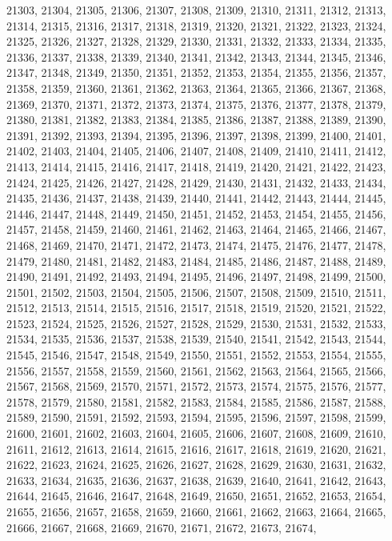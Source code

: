 21303,
21304,
21305,
21306,
21307,
21308,
21309,
21310,
21311,
21312,
21313,
21314,
21315,
21316,
21317,
21318,
21319,
21320,
21321,
21322,
21323,
21324,
21325,
21326,
21327,
21328,
21329,
21330,
21331,
21332,
21333,
21334,
21335,
21336,
21337,
21338,
21339,
21340,
21341,
21342,
21343,
21344,
21345,
21346,
21347,
21348,
21349,
21350,
21351,
21352,
21353,
21354,
21355,
21356,
21357,
21358,
21359,
21360,
21361,
21362,
21363,
21364,
21365,
21366,
21367,
21368,
21369,
21370,
21371,
21372,
21373,
21374,
21375,
21376,
21377,
21378,
21379,
21380,
21381,
21382,
21383,
21384,
21385,
21386,
21387,
21388,
21389,
21390,
21391,
21392,
21393,
21394,
21395,
21396,
21397,
21398,
21399,
21400,
21401,
21402,
21403,
21404,
21405,
21406,
21407,
21408,
21409,
21410,
21411,
21412,
21413,
21414,
21415,
21416,
21417,
21418,
21419,
21420,
21421,
21422,
21423,
21424,
21425,
21426,
21427,
21428,
21429,
21430,
21431,
21432,
21433,
21434,
21435,
21436,
21437,
21438,
21439,
21440,
21441,
21442,
21443,
21444,
21445,
21446,
21447,
21448,
21449,
21450,
21451,
21452,
21453,
21454,
21455,
21456,
21457,
21458,
21459,
21460,
21461,
21462,
21463,
21464,
21465,
21466,
21467,
21468,
21469,
21470,
21471,
21472,
21473,
21474,
21475,
21476,
21477,
21478,
21479,
21480,
21481,
21482,
21483,
21484,
21485,
21486,
21487,
21488,
21489,
21490,
21491,
21492,
21493,
21494,
21495,
21496,
21497,
21498,
21499,
21500,
21501,
21502,
21503,
21504,
21505,
21506,
21507,
21508,
21509,
21510,
21511,
21512,
21513,
21514,
21515,
21516,
21517,
21518,
21519,
21520,
21521,
21522,
21523,
21524,
21525,
21526,
21527,
21528,
21529,
21530,
21531,
21532,
21533,
21534,
21535,
21536,
21537,
21538,
21539,
21540,
21541,
21542,
21543,
21544,
21545,
21546,
21547,
21548,
21549,
21550,
21551,
21552,
21553,
21554,
21555,
21556,
21557,
21558,
21559,
21560,
21561,
21562,
21563,
21564,
21565,
21566,
21567,
21568,
21569,
21570,
21571,
21572,
21573,
21574,
21575,
21576,
21577,
21578,
21579,
21580,
21581,
21582,
21583,
21584,
21585,
21586,
21587,
21588,
21589,
21590,
21591,
21592,
21593,
21594,
21595,
21596,
21597,
21598,
21599,
21600,
21601,
21602,
21603,
21604,
21605,
21606,
21607,
21608,
21609,
21610,
21611,
21612,
21613,
21614,
21615,
21616,
21617,
21618,
21619,
21620,
21621,
21622,
21623,
21624,
21625,
21626,
21627,
21628,
21629,
21630,
21631,
21632,
21633,
21634,
21635,
21636,
21637,
21638,
21639,
21640,
21641,
21642,
21643,
21644,
21645,
21646,
21647,
21648,
21649,
21650,
21651,
21652,
21653,
21654,
21655,
21656,
21657,
21658,
21659,
21660,
21661,
21662,
21663,
21664,
21665,
21666,
21667,
21668,
21669,
21670,
21671,
21672,
21673,
21674,
